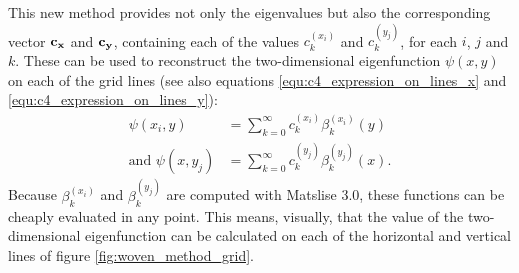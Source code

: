 This new method provides not only the eigenvalues but also the corresponding vector $\vb{c_x}$ and $\vb{c_y}$, containing each of the values $c_k^{(x_i)}$ and $c_k^{(y_j)}$, for each $i$, $j$ and $k$. These can be used to reconstruct the two-dimensional eigenfunction $\psi(x, y)$ on each of the grid lines (see also equations \eqref{equ:c4_expression_on_lines_x} and \eqref{equ:c4_expression_on_lines_y}):
\begin{align*}
    \psi(x_i, y)             & = \sum_{k=0}^\infty c_k^{(x_i)} \beta_k^{(x_i)}(y)          \\
    \text{and } \psi(x, y_j) & = \sum_{k=0}^\infty c_k^{(y_j)} \beta_k^{(y_j)}(x) \text{.}
\end{align*}
Because $\beta_k^{(x_i)}$ and $\beta_k^{(y_j)}$ are computed with Matslise 3.0, these functions can be cheaply evaluated in any point. This means, visually, that the value of the two-dimensional eigenfunction can be calculated on each of the horizontal and vertical lines of figure \ref{fig:woven_method_grid}.

